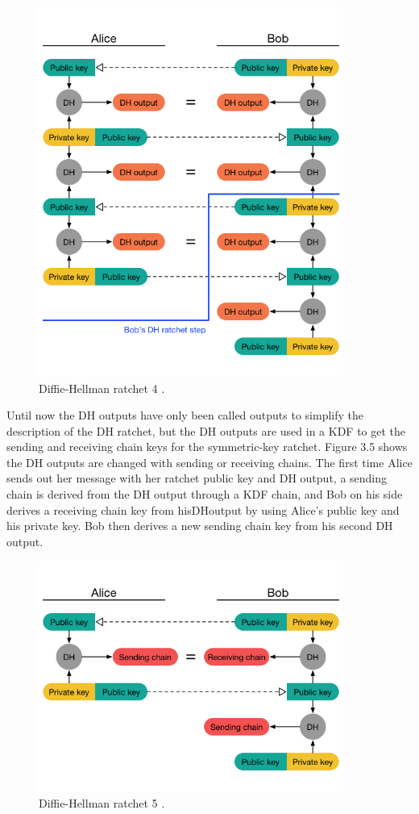 \begin{figure}[H]
	\centering
	\includegraphics[width=10cm]{figures/dhratchet4.png}
	\caption{Diffie-Hellman ratchet 4 \cite{doubleratchet}.}
	\label{fig:dhratchet4}
\end{figure}

Until now the DH outputs have only been called outputs to simplify the
description of the DH ratchet, but the DH outputs are used in a KDF to get
the sending and receiving chain keys for the symmetric-key ratchet. Figure
3.5 shows the DH outputs are changed with sending or receiving chains.
The first time Alice sends out her message with her ratchet public key and
DH output, a sending chain is derived from the DH output through a KDF
chain, and Bob on his side derives a receiving chain key from hisDHoutput
by using Alice’s public key and his private key. Bob then derives a new
sending chain key from his second DH output.


\begin{figure}[H]
	\centering
	\includegraphics[width=10cm]{figures/dhratchet5.png}
	\caption{Diffie-Hellman ratchet 5 \cite{doubleratchet}.}
	\label{fig:dhratchet5}
\end{figure}



